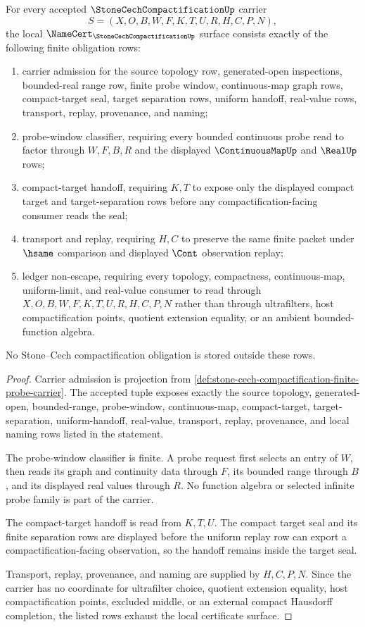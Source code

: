 \begin{theorem}
\label{thm:stone-cech-compactification-namecert-obligations}
For every accepted $\StoneCechCompactificationUp$ carrier
$$
S=(X,O,B,W,F,K,T,U,R,H,C,P,N),
$$
the local $\NameCert_{\StoneCechCompactificationUp}$ surface consists exactly of the following finite obligation rows:
\begin{enumerate}
\item carrier admission for the source topology row, generated-open inspections, bounded-real range row, finite probe window, continuous-map graph rows, compact-target seal, target separation rows, uniform handoff, real-value rows, transport, replay, provenance, and naming;
\item probe-window classifier, requiring every bounded continuous probe read to factor through $W,F,B,R$ and the displayed $\ContinuousMapUp$ and $\RealUp$ rows;
\item compact-target handoff, requiring $K,T$ to expose only the displayed compact target and target-separation rows before any compactification-facing consumer reads the seal;
\item transport and replay, requiring $H,C$ to preserve the same finite packet under $\hsame$ comparison and displayed $\Cont$ observation replay;
\item ledger non-escape, requiring every topology, compactness, continuous-map, uniform-limit, and real-value consumer to read through $X,O,B,W,F,K,T,U,R,H,C,P,N$ rather than through ultrafilters, host compactification points, quotient extension equality, or an ambient bounded-function algebra.
\end{enumerate}
No Stone--Cech compactification obligation is stored outside these rows.
\end{theorem}
\begin{proof}
Carrier admission is projection from \autoref{def:stone-cech-compactification-finite-probe-carrier}. The accepted tuple exposes exactly the source topology, generated-open, bounded-range, probe-window, continuous-map, compact-target, target-separation, uniform-handoff, real-value, transport, replay, provenance, and local naming rows listed in the statement.

The probe-window classifier is finite. A probe request first selects an entry of $W$, then reads its graph and continuity data through $F$, its bounded range through $B$, and its displayed real values through $R$. No function algebra or selected infinite probe family is part of the carrier.

The compact-target handoff is read from $K,T,U$. The compact target seal and its finite separation rows are displayed before the uniform replay row can export a compactification-facing observation, so the handoff remains inside the target seal.

Transport, replay, provenance, and naming are supplied by $H,C,P,N$. Since the carrier has no coordinate for ultrafilter choice, quotient extension equality, host compactification points, excluded middle, or an external compact Hausdorff completion, the listed rows exhaust the local certificate surface.
\end{proof}

